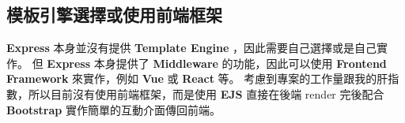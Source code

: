 \documentclass{article}
\begin{document}
\subsection{模板引擎選擇或使用前端框架}

\textbf{Express} 本身並沒有提供 \textbf{Template Engine} ，因此需要自己選擇或是自己實作。
但 \textbf{Express} 本身提供了 \textbf{Middleware} 的功能，因此可以使用 \textbf{Frontend Framework} 來實作，例如 \textbf{Vue} 或 \textbf{React} 等。
考慮到專案的工作量跟我的肝指數，所以目前沒有使用前端框架，而是使用 \textbf{EJS} 直接在後端 render 完後配合 \textbf{Bootstrap} 實作簡單的互動介面傳回前端。
\end{document}
